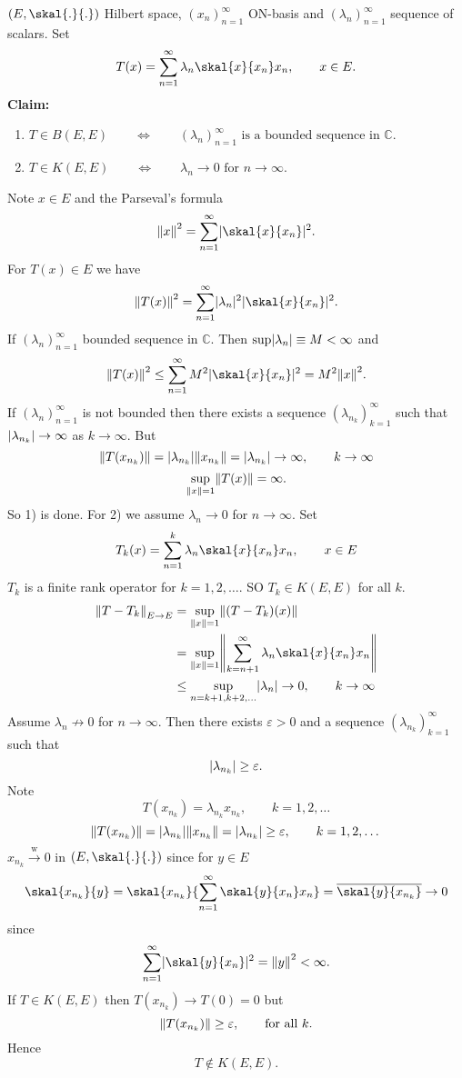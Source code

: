 \begin{beispiel}
	$(E,\skal{.}{.})$ Hilbert space, $(x_{n})_{n=1}^{\infty}$ ON-basis and $(\lambda_n)_{n=1}^{\infty}$ sequence of scalars. Set
\[
	T(x) = \sum_{n=1}^{\infty}\lambda_n \skal{x}{x_n} x_n, \qquad x \in E.
\]	
\textbf{Claim:} \text{    }     
\begin{enumerate}[1)]
	\item $T \in B(E,E) \qquad \Leftrightarrow \qquad (\lambda_n)^{\infty}_{n=1} \text{ is a bounded sequence in $\mathbb{C}$}$.
	\item$T \in K(E,E) \qquad \Leftrightarrow \qquad \lambda_n \to 0 \text{ for }n \to \infty$.
\end{enumerate}
Note $x \in E$ and the Parseval's formula
\[
	\norm{x}^2 = \sum_{n=1}^{\infty} \abs{\skal{x}{x_n}}^2.
\]
For $T(x) \in E$ we have
\[
	\norm{T(x)}^2 = \sum_{n=1}^{\infty} \abs{\lambda_n}^2 \abs{\skal{x}{x_n}}^2.
\]
If $(\lambda_n)_{n=1}^{\infty}$ bounded sequence in $\mathbb{C}$. Then $\sup \lvert\lambda_n\rvert \equiv M < \infty$ and
\[
	\norm{T(x)}^2 \leq \sum_{n=1}^{\infty} M^2 \abs{\skal{x}{x_n}}^2 = M^2 \norm{x}^2.
\]
If $(\lambda_n)_{n=1}^{\infty}$ is not bounded then there exists a sequence $(\lambda_{n_k})_{k=1}^{\infty}$ such that $\lvert\lambda_{n_k}\rvert \to \infty$ as $k \to \infty$. But
\[
	\norm{T(x_{n_k})} = \abs{\lambda_{n_k}}\norm{x_{n_k}} = \abs{\lambda_{n_k}} \to \infty, \qquad k \to \infty
\]
\[
	\sup\limits_{\norm{x}=1} \norm{T(x)} = \infty.
\]
So 1) is done. For 2) we assume $\lambda_n \to 0$ for $n \to \infty$. Set 
\[
	T_k(x)= \sum_{n=1}^{k}\lambda_n \skal{x}{x_n}x_n, \qquad x \in E
\]
$T_k$ is a finite rank operator for $k=1,2,\dots$. SO $T_k \in K(E,E)$ for all $k$.
\begin{align*}
	\norm{T-T_k}_{E \to E} &= \sup_{\norm{x}=1} \norm{(T-T_k)(x)} \\ &= \sup_{\norm{x}=1} \norm{\sum_{k=n+1}^{\infty} \lambda_n \skal{x}{x_n}x_n} \\
	& \leq \sup\limits_{n= k+1,k+2,\dots}\abs{\lambda_n} \to 0, \qquad k \to \infty
\end{align*}
Assume $\lambda_n \not \to 0$ for $n \to \infty$. Then there exists $\varepsilon >0$ and a sequence $(\lambda_{n_k})_{k=1}^{\infty}$ such that 
\[
	\lvert\lambda_{n_k}\rvert \geq \varepsilon.
\]
Note
\[
	T(x_{n_k})= \lambda_{n_k}x_{n_k}, \qquad k =1,2,\dots
\]
\[
	\norm{T(x_{n_k})} = \abs{\lambda_{n_k}} \norm{x_{n_k}} = \abs{\lambda_{n_k}} \geq \varepsilon, \qquad k = 1,2,\dots
\]
$x_{n_k} \stackrel{\text{w}}{\to }0$ in $(E,\skal{.}{.})$ since for $y \in E$
\[
	\skal{x_{n_k}}{y} = \skal{x_{n_k}}{\sum_{n=1}^{\infty}\skal{y}{x_n}x_n} = \overline{\skal{y}{x_{n_k}}} \to 0
\]
since
\[
	\sum_{n=1}^{\infty}\abs{\skal{y}{x_n}}^2 = \norm{y}^2 < \infty.
\]
If $T \in K(E,E)$ then $T(x_{n_k}) \to T(0)=0$ but \[
	\norm{T(x_{n_k})} \geq \varepsilon, \qquad \text{for all }k.
\]
Hence
\[
	T \not \in K(E,E).
\]
\end{beispiel}
